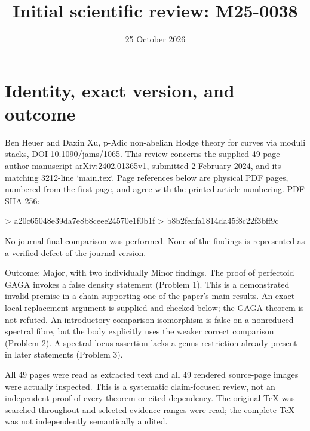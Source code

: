 \documentclass[10pt]{article}
\title{Initial scientific review: M25-0038}
\author{}
\date{25 October 2026}
\begin{document}
\maketitle
\section*{Identity, exact version, and outcome}
Ben Heuer and Daxin Xu, p-Adic non-abelian Hodge theory for curves via moduli stacks, DOI 10.1090/jams/1065. This review concerns the supplied 49-page author manuscript arXiv:2402.01365v1, submitted 2 February 2024, and its matching 3212-line `main.tex`. Page references below are physical PDF pages, numbered from the first page, and agree with the printed article numbering. PDF SHA-256:\par
> a20c65048e39da7e8b8ceee24570e1f0b1f
> b8b2feafa1814da45f8c22f3bff9c\par
No journal-final comparison was performed. None of the findings is represented as a verified defect of the journal version.\par
Outcome: Major, with two individually Minor findings. The proof of perfectoid GAGA invokes a false density statement (Problem 1). This is a demonstrated invalid premise in a chain supporting one of the paper’s main results. An exact local replacement argument is supplied and checked below; the GAGA theorem is not refuted. An introductory comparison isomorphism is false on a nonreduced spectral fibre, but the body explicitly uses the weaker correct comparison (Problem 2). A spectral-locus assertion lacks a genus restriction already present in later statements (Problem 3).\par
All 49 pages were read as extracted text and all 49 rendered source-page images were actually inspected. This is a systematic claim-focused review, not an independent proof of every theorem or cited dependency. The original TeX was searched throughout and selected evidence ranges were read; the complete TeX was not independently semantically audited.\par
\end{document}
